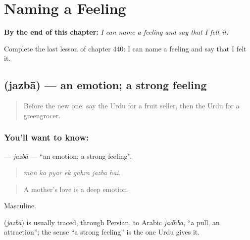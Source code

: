 
\chapter{Naming a Feeling}
\label{ch:ur-naming-a-feeling}

\begin{chapteropening}
\textbf{By the end of this chapter:} \emph{I can name a feeling and say that I felt it.}

Complete the last lesson of chapter 440: I can name a feeling and say that I felt it.
\end{chapteropening}

\section[\texorpdfstring{\ur{جذبہ} (jazbā)}{جذبہ (jazbā)}]{ (jazbā) — an emotion; a strong feeling}

\label{lesson:UR-C440-jazba}



\begin{quote}
Before the new one: say the Urdu for a fruit seller, then the Urdu for a greengrocer.
\end{quote}

\subsection*{You'll want to know: }
\textbf{} — \emph{jazbā} — \textquotedblleft{}an emotion; a strong feeling\textquotedblright{}.

\begin{quote}
      
\end{quote}

\begin{quote}
\emph{māṅ kā pyār ek gahrā jazbā hai.}
\end{quote}

\begin{quote}
A mother's love is a deep emotion.
\end{quote}

Masculine.

\begin{cousinweb}
\textbf{} (\emph{jazbā}) is usually traced, through Persian, to Arabic \emph{jadhba}, \textquotedblleft{}a pull, an attraction\textquotedblright{}; the sense \textquotedblleft{}a strong feeling\textquotedblright{} is the one Urdu gives it.
\end{cousinweb}

